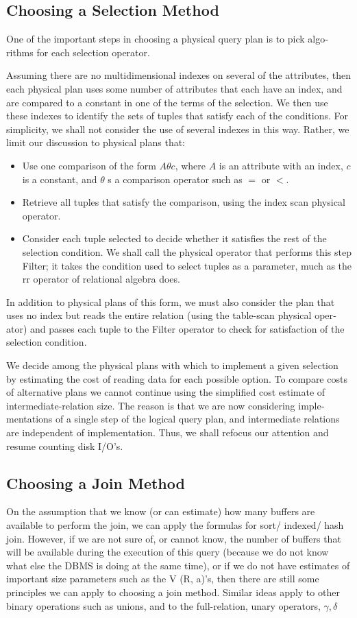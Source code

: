 \subsection{Choosing a Selection Method}
One of the important steps in choosing a physical query plan is to pick algo­rithms for each selection operator.
\par Assuming there are no multidimensional indexes on several of the attributes,
then each physical plan uses some number of attributes that each have an index, and are compared to a constant in one of the terms of the selection. We then use these indexes to identify the sets of tuples that satisfy each of the
conditions. For simplicity, we shall not consider the use of several indexes in this way. Rather, we limit our discussion to physical plans that:
\begin{itemize}
    \item Use one comparison of the form $A\theta c$, where $A$ is an attribute with an index, $c$ is a constant, and $\theta$ s a comparison operator such as $=$ or $<$.
    \item Retrieve all tuples that satisfy the comparison, using the index­ scan physical operator.
    \item Consider each tuple selected to decide whether it satisfies the rest of the selection condition. We shall call the physical operator that per­forms this step Filter; it takes the condition used to select tuples as a parameter, much as the rr operator of relational algebra does.
\end{itemize}
In addition to physical plans of this form, we must also consider the plan that uses no index but reads the entire relation (using the table-scan physical oper­ator) and passes each tuple to the Filter operator to check for satisfaction of the selection condition. 
\par We decide among the physical plans with which to implement a given selec­tion by estimating the cost of reading data for each possible option. To compare costs of alternative plans we cannot continue using the simplified cost estimate of intermediate-relation size. The reason is that we are now considering imple­mentations of a single step of the logical query plan, and intermediate relations are independent of implementation. Thus, we shall refocus our attention and resume counting disk I/O's.

\subsection{Choosing a Join Method}
On the assumption that we know (or can estimate) how many buffers are available to perform the join, we can apply the formulas for sort/ indexed/ hash join. However, if we are not sure of, or cannot know, the number of buffers that will be available during the execution of this query (because we do not know what else the DBMS is doing at the same time), or if we do not have estimates of important size parameters such as the V (R, a)'s, then there are still some principles we can apply to choosing a join method. Similar ideas apply to other binary operations such as unions, and to the full-relation, unary operators, $\gamma, \delta$


